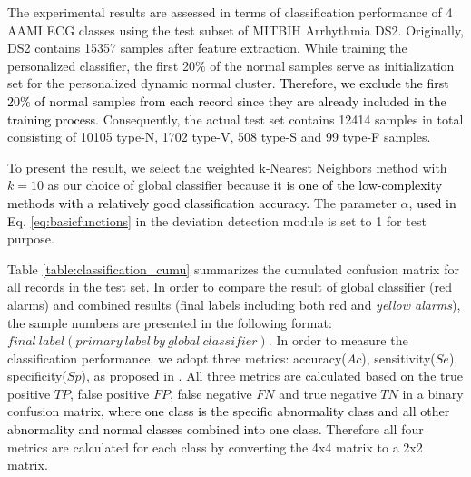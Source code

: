 The experimental results are assessed in terms of classification performance of 4 AAMI ECG classes using the test subset of MITBIH Arrhythmia DS2. Originally, DS2 contains 15357 samples after feature extraction. While training the personalized classifier, the first 20\% of the normal samples serve as initialization set for the personalized dynamic normal cluster. \textcolor{black}{Therefore, we exclude the first 20\% of normal samples from each record since they are already included in the training process.} Consequently, the actual test set contains 12414 samples in total consisting of 10105 type-N, 1702 type-V, 508 type-S and 99 type-F samples.

To present the result, we select the weighted k-Nearest Neighbors method with $k=10$ as our choice of global classifier because it is \textcolor{black}{one of the low-complexity methods with a relatively good classification accuracy\cite{hechenbichler2004weighted}. }%
The parameter $\alpha$, \textcolor{black}{used in Eq. \ref{eq:basicfunctions}} in the deviation detection module is set to 1 for test purpose. 


Table \ref{table:classification_cumu} summarizes the cumulated confusion matrix for all records in the test set. In order to compare the result of global classifier (red alarms) and combined results (final labels including both red and \textit{yellow alarms}), the sample numbers are presented in the following format: $final~label(primary~label~by~global~ classifier)$. In order to measure the classification performance, we adopt three metrics: accuracy($Ac$), sensitivity($Se$), specificity($Sp$), as proposed in \cite{Hu_et_al,deChazal2006,ince2009generic}. All three metrics are calculated based on the true positive $TP$, false positive $FP$, false negative $FN$ and true negative $TN$ in a binary confusion matrix, \textcolor{black}{where one class is the specific abnormality class and all other abnormality and normal classes combined into one class}. Therefore all four metrics are calculated for each class by converting the 4x4 matrix to a 2x2 matrix.


